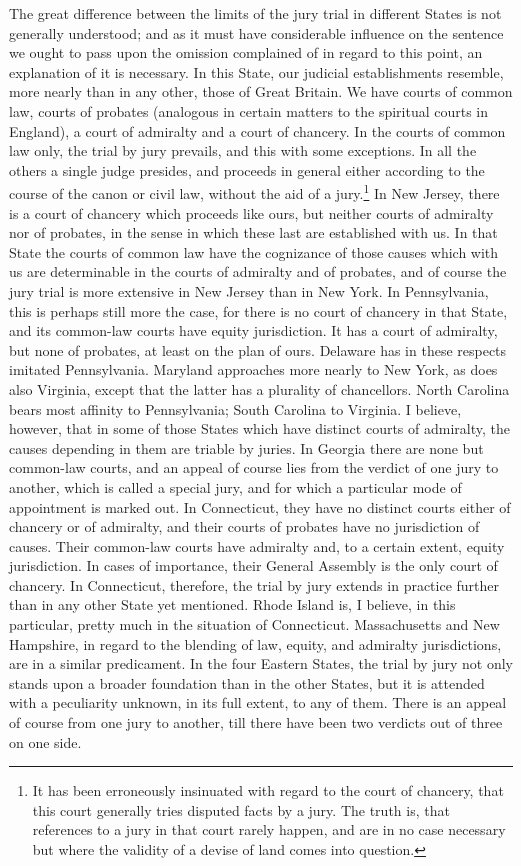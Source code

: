 The great difference between the limits of the jury trial in different States is not generally understood; and as it must have considerable influence on the sentence we ought to pass upon the omission complained of in regard to this point, an explanation of it is necessary. In this State, our judicial establishments resemble, more nearly than in any other, those of Great Britain. We have courts of common law, courts of probates (analogous in certain matters to the spiritual courts in England), a court of admiralty and a court of chancery. In the courts of common law only, the trial by jury prevails, and this with some exceptions. In all the others a single judge presides, and proceeds in general either according to the course of the canon or civil law, without the aid of a jury.\footnote{It has been erroneously insinuated with regard to the court of chancery, that this court generally tries disputed facts by a jury. The truth is, that references to a jury in that court rarely happen, and are in no case necessary but where the validity of a devise of land comes into question.} In New Jersey, there is a court of chancery which proceeds like ours, but neither courts of admiralty nor of probates, in the sense in which these last are established with us. In that State the courts of common law have the cognizance of those causes which with us are determinable in the courts of admiralty and of probates, and of course the jury trial is more extensive in New Jersey than in New York. In Pennsylvania, this is perhaps still more the case, for there is no court of chancery in that State, and its common-law courts have equity jurisdiction. It has a court of admiralty, but none of probates, at least on the plan of ours. Delaware has in these respects imitated Pennsylvania. Maryland approaches more nearly to New York, as does also Virginia, except that the latter has a plurality of chancellors. North Carolina bears most affinity to Pennsylvania; South Carolina to Virginia. I believe, however, that in some of those States which have distinct courts of admiralty, the causes depending in them are triable by juries. In Georgia there are none but common-law courts, and an appeal of course lies from the verdict of one jury to another, which is called a special jury, and for which a particular mode of appointment is marked out. In Connecticut, they have no distinct courts either of chancery or of admiralty, and their courts of probates have no jurisdiction of causes. Their common-law courts have admiralty and, to a certain extent, equity jurisdiction. In cases of importance, their General Assembly is the only court of chancery. In Connecticut, therefore, the trial by jury extends in practice further than in any other State yet mentioned. Rhode Island is, I believe, in this particular, pretty much in the situation of Connecticut. Massachusetts and New Hampshire, in regard to the blending of law, equity, and admiralty jurisdictions, are in a similar predicament. In the four Eastern States, the trial by jury not only stands upon a broader foundation than in the other States, but it is attended with a peculiarity unknown, in its full extent, to any of them. There is an appeal of course from one jury to another, till there have been two verdicts out of three on one side.

